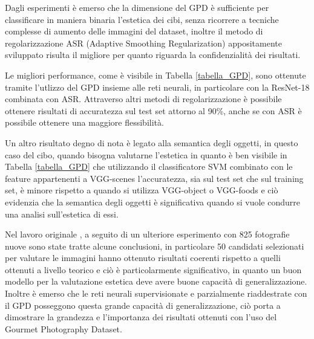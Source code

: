 Dagli esperimenti è emerso che la dimensione del GPD è sufficiente per classificare in maniera binaria l'estetica dei cibi, senza ricorrere a tecniche complesse di aumento delle immagini del dataset, inoltre il metodo di regolarizzazione ASR (Adaptive Smoothing Regularization) appositamente sviluppato \cite{sheng2021learning} risulta il migliore per quanto riguarda la confidenzialità dei risultati.

Le migliori performance, come è visibile in Tabella \ref{tabella_GPD}, sono ottenute tramite l'utlizzo del GPD insieme alle reti neurali, in particolare con la ResNet-18 combinata con ASR.  Attraverso altri metodi di regolarizzazione è possibile ottenere risultati di accuratezza sul test set attorno al 90\%, anche se con ASR è possibile ottenere una maggiore flessibilità.

Un altro risultato degno di nota è legato alla semantica degli oggetti, in questo caso del cibo, quando bisogna valutarne l'estetica in quanto è ben visibile in Tabella \ref{tabella_GPD} che utilizzando il classificatore SVM combinato con le feature appartenenti a VGG-scenes l'accuratezza, sia sul test set che sul training set, è minore rispetto a quando si utilizza VGG-object o VGG-foods e ciò evidenzia che la semantica degli oggetti è significativa quando si vuole condurre una analisi sull'estetica di essi. 

Nel lavoro originale \cite{sheng2021learning}, a seguito di un ulteriore esperimento con 825 fotografie nuove sono state tratte alcune conclusioni, in particolare 50 candidati selezionati per valutare le immagini hanno ottenuto risultati coerenti rispetto a quelli ottenuti a livello teorico e ciò è particolarmente significativo, in quanto un buon modello per la valutazione estetica deve avere buone capacità di generalizzazione. Inoltre è emerso che le reti neurali supervisionate e parzialmente riaddestrate con il GPD posseggono questa grande capacità di generalizzazione, ciò porta a dimostrare la grandezza e l'importanza dei risultati ottenuti con l'uso del Gourmet Photography Dataset. 

